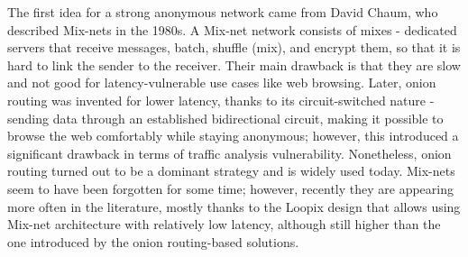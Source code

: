 The first idea for a strong anonymous network came from David Chaum, who described Mix-nets in the 1980s. A Mix-net network consists of mixes - dedicated servers that receive messages, batch, shuffle (mix), and encrypt them, so that it is hard to link the sender to the receiver. Their main drawback is that they are slow and not good for latency-vulnerable use cases like web browsing. Later, onion routing was invented for lower latency, thanks to its circuit-switched nature - sending data through an established bidirectional circuit, making it possible to browse the web comfortably while staying anonymous; however, this introduced a significant drawback in terms of traffic analysis vulnerability. Nonetheless, onion routing turned out to be a dominant strategy and is widely used today. Mix-nets seem to have been forgotten for some time; however, recently they are appearing more often in the literature, mostly thanks to the Loopix design that allows using Mix-net architecture with relatively low latency, although still higher than the one introduced by the onion routing-based solutions.

